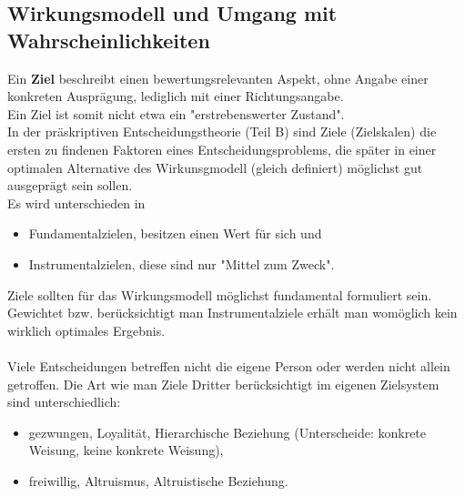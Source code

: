 \subsection{Wirkungsmodell und Umgang mit Wahrscheinlichkeiten}
Ein \textbf{Ziel} beschreibt einen bewertungsrelevanten Aspekt, ohne Angabe einer konkreten Ausprägung, lediglich mit einer Richtungsangabe.\\
Ein Ziel ist somit nicht etwa ein "erstrebenswerter Zustand".\\
In der präskriptiven Entscheidungstheorie (Teil B) sind Ziele (Zielskalen) die ersten zu findenen Faktoren eines Entscheidungsproblems, die später in einer optimalen Alternative des Wirkunsgmodell (gleich definiert) möglichst gut ausgeprägt sein sollen.\\
Es wird unterschieden in
\begin{itemize}
	\item Fundamentalzielen, besitzen einen Wert für sich und
	\item Instrumentalzielen, diese sind nur "Mittel zum Zweck".
\end{itemize}
Ziele sollten für das Wirkungsmodell möglichst fundamental formuliert sein. Gewichtet bzw. berücksichtigt man Instrumentalziele erhält man womöglich kein wirklich optimales Ergebnis.\\
\ \\
Viele Entscheidungen betreffen nicht die eigene Person oder werden nicht allein getroffen. Die Art wie man Ziele Dritter berücksichtigt im eigenen Zielsystem sind unterschiedlich:
\begin{itemize}
	\item gezwungen, Loyalität, Hierarchische Beziehung (Unterscheide: konkrete Weisung, keine konkrete Weisung),
	\item freiwillig, Altruismus, Altruistische Beziehung.
\end{itemize}

